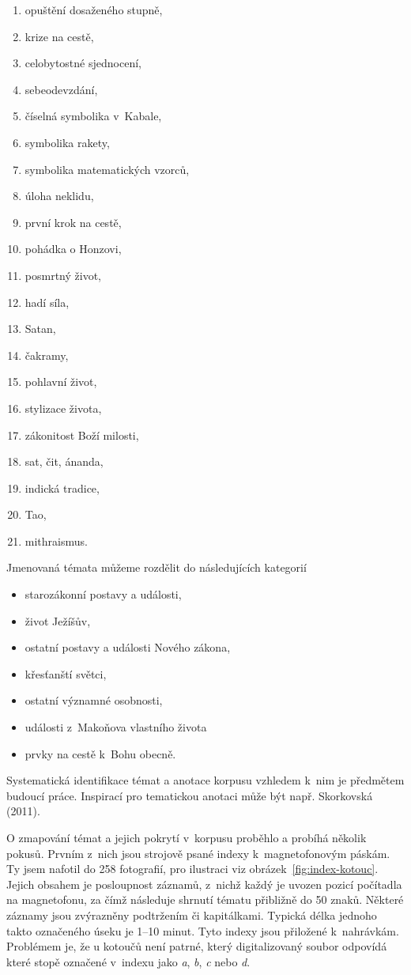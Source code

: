 \begin{enumerate}
\item{opuštění dosaženého stupně,}
\item{krize na cestě,}
\item{celobytostné sjednocení,}
\item{sebeodevzdání,}
\item{číselná symbolika v~Kabale,}
\item{symbolika rakety,}
\item{symbolika matematických vzorců,}
\item{úloha neklidu,}
\item{první krok na cestě,}
\item{pohádka o Honzovi,}
\item{posmrtný život,}
\item{hadí síla,}
\item{Satan,}
\item{čakramy,}
\item{pohlavní život,}
\item{stylizace života,}
\item{zákonitost Boží milosti,}
\item{sat, čit, ánanda,}
\item{indická tradice,}
\item{Tao,}
\item{mithraismus.}

\end{enumerate}

Jmenovaná témata můžeme rozdělit do následujících kategorií
\begin{itemize}
\item{starozákonní postavy a události,}
\item{život Ježíšův,}
\item{ostatní postavy a události Nového zákona,}
\item{křesťanští světci,}
\item{ostatní významné osobnosti,}
\item{události z~Makoňova vlastního života}
\item{prvky na cestě k~Bohu obecně.}
\end{itemize}

Systematická
identifikace témat a anotace korpusu vzhledem k~nim je předmětem budoucí práce.
Inspirací pro tematickou anotaci může být např. Skorkovská (2011)\cite{skorkovska2011automatic}.


O zmapování témat a jejich pokrytí v~korpusu proběhlo a probíhá několik pokusů.
Prvním z~nich jsou strojově psané indexy k~magnetofonovým
páskám. Ty jsem nafotil do 258 fotografií, pro ilustraci viz
obrázek~\ref{fig:index-kotouc}. Jejich obsahem je posloupnost
záznamů, z~nichž každý je uvozen pozicí počítadla na magnetofonu, za čímž
následuje shrnutí tématu přibližně do 50 znaků. Některé záznamy jsou zvýrazněny
podtržením či kapitálkami. Typická délka jednoho takto označeného úseku je 1--10
minut. Tyto indexy jsou přiložené k~nahrávkám. Problémem je, že u kotoučů
není patrné, který digitalizovaný soubor odpovídá které stopě označené v~indexu
jako {\em a}, {\em b}, {\em c} nebo {\em d}.

